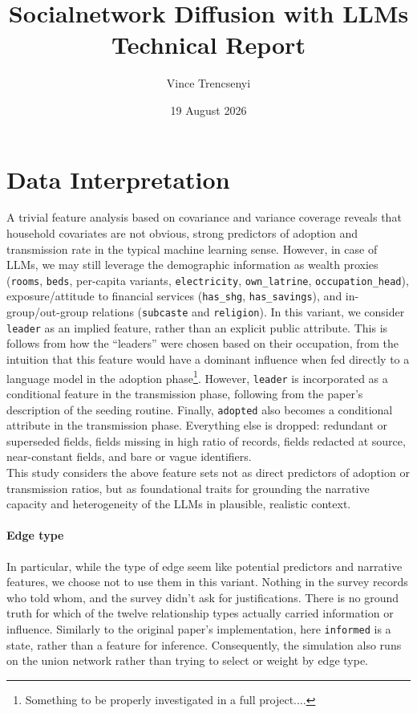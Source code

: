 \documentclass[11pt]{article}
\title{Socialnetwork Diffusion with LLMs\\ Technical Report}
\author{Vince Trencsenyi}
\date{19 August 2026}
\begin{document}
\maketitle
\vspace{-1.5em}


\vspace{0.5em}
\section{Data Interpretation~\citep{Banerjee2013}}

A trivial feature analysis based on covariance and variance coverage reveals that household covariates are not obvious, strong predictors of adoption and transmission rate in the typical machine learning sense.
However, in case of LLMs, we may still leverage the demographic information as wealth proxies (\texttt{rooms}, \texttt{beds}, per-capita variants, \texttt{electricity}, \texttt{own\_latrine}, \texttt{occupation\_head}), exposure/attitude to financial services (\texttt{has\_shg}, \texttt{has\_savings}), and in-group/out-group relations (\texttt{subcaste} and \texttt{religion}). In this variant, we consider \texttt{leader} as an implied feature, rather than an explicit public attribute. This is follows from how the ``leaders'' were chosen based on their occupation, from the intuition that this feature would have a dominant influence when fed directly to a language model in the adoption phase\footnote{Something to be properly investigated in a full project....}. However, \texttt{leader} is incorporated as a conditional feature in the transmission phase, following from the paper's description of the seeding routine. Finally, \texttt{adopted} also becomes a conditional attribute in the transmission phase. Everything else is dropped: redundant or superseded fields, fields missing in high ratio of records, fields redacted at source, near-constant fields, and bare or vague identifiers.\\


\noindent This study considers the above feature sets not as direct predictors of adoption or transmission ratios, but as foundational traits for grounding the narrative capacity and heterogeneity of the LLMs in plausible, realistic context.

\paragraph{Edge type} In particular, while the type of edge seem like potential predictors and narrative features, we choose not to use them in this variant. Nothing in the survey records who told whom, and the survey didn't ask for justifications. There is no ground truth for which of the twelve relationship types actually carried information or influence. Similarly to the original paper's implementation, here \texttt{informed} is a state, rather than a feature for inference. Consequently, the simulation also runs on the union network rather than trying to select or weight by edge type.
\end{document}
